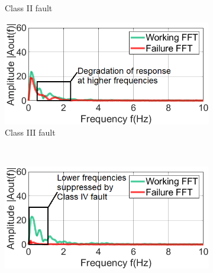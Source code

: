 \documentclass[manuscript,screen,review]{acmart} %
\providecommand{\DIFdel}[1]{{\protect\color{red}\sout{#1}}}                      %
\providecommand{\DIFdelFL}[1]{\DIFdel{#1}} %
\providecommand{\DIFaddbeginFL}{} %
\providecommand{\DIFaddendFL}{} %
\providecommand{\DIFdelbeginFL}{} %
\providecommand{\DIFdelendFL}{} %
\newcommand{\DIFscaledelfig}{0.5}
\newlength{\DIFdelgraphicswidth} %
\newlength{\DIFdelgraphicsheight} %
\newcommand{\DIFaddincludegraphics}[2][]{{\color{blue}\fbox{\DIFOincludegraphics[#1]{#2}}}} %
\newcommand{\DIFdelincludegraphics}[2][]{%
\sbox{\DIFdelgraphicsbox}{\DIFOincludegraphics[#1]{#2}}%
\settoboxwidth{\DIFdelgraphicswidth}{\DIFdelgraphicsbox} %
\settoboxtotalheight{\DIFdelgraphicsheight}{\DIFdelgraphicsbox} %
\scalebox{\DIFscaledelfig}{%
\parbox[b]{\DIFdelgraphicswidth}{\usebox{\DIFdelgraphicsbox}\\[-\baselineskip] \rule{\DIFdelgraphicswidth}{0em}}\llap{\resizebox{\DIFdelgraphicswidth}{\DIFdelgraphicsheight}{%
\setlength{\unitlength}{\DIFdelgraphicswidth}%
\begin{picture}(1,1)%
\thicklines\linethickness{2pt} %
{\color[rgb]{1,0,0}\put(0,0){\framebox(1,1){}}}%
{\color[rgb]{1,0,0}\put(0,0){\line( 1,1){1}}}%
{\color[rgb]{1,0,0}\put(0,1){\line(1,-1){1}}}%
\end{picture}%
}\hspace*{3pt}}} %
} %
\DeclareRobustCommand{\DIFaddbeginFL}{\DIFOaddbeginFL \let\includegraphics\DIFaddincludegraphics} %
\DeclareRobustCommand{\DIFaddendFL}{\DIFOaddendFL \let\includegraphics\DIFOincludegraphics} %
\DeclareRobustCommand{\DIFdelbeginFL}{\DIFOdelbeginFL \let\includegraphics\DIFdelincludegraphics} %
\DeclareRobustCommand{\DIFdelendFL}{\DIFOaddendFL \let\includegraphics\DIFOincludegraphics} %
\begin{document}
\begin{figure}
\begin{subfigure}[t]{0.33\textwidth}
		\DIFaddendFL \caption{Class II fault}
		\label{fig:classII_fault_freq}
	\end{subfigure}
	\DIFdelbeginFL %
\DIFdelendFL \DIFaddbeginFL \begin{subfigure}[t]{0.325\textwidth}
		\DIFaddendFL \centering
\DIFdelbeginFL %
\DIFdelendFL \DIFaddbeginFL \includegraphics[width=\textwidth]{figures/2-PIR-Fault/normal-classIII/class3_fft_coloradj_small_edited_camera_ready.png}
		\DIFaddendFL \caption{Class III fault}
		\label{fig:classIII_fault_freq}
	\end{subfigure}\DIFdelbeginFL \DIFdelFL{\hspace{1ex}
	}%
\DIFdelendFL \DIFaddbeginFL \\
	\begin{subfigure}[t]{0.33\linewidth}
		\DIFaddendFL \centering
\DIFdelbeginFL %
\DIFdelendFL \DIFaddbeginFL \includegraphics[width=\linewidth]{figures/2-PIR-Fault/normal-classIV/class4_fft_coloradj_small_edited_camera_ready.png}

\end{subfigure}
\end{figure}
\end{document}
